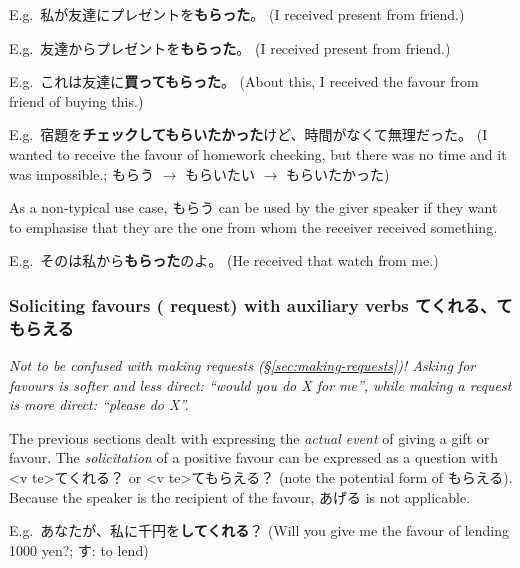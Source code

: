 \documentclass[../nihongo-gakushuu-kyouzai.tex]{subfiles}
\begin{document}


E.g.\ 私が友達にプレゼントを\textbf{もらった}。 (I received present from friend.)

E.g.\ 友達からプレゼントを\textbf{もらった}。 (I received present from friend.)

E.g.\ これは友達に\textbf{買ってもらった}。 (About this, I received the favour from friend of buying this.)

E.g.\ 宿題を\textbf{チェックしてもらいたかった}けど、時間がなくて無理だった。 (I wanted to receive the favour of homework checking, but there was no time and it was impossible.; もらう $\to$ もらいたい $\to$ もらいたかった)

As a non-typical use case, もらう can be used by the giver speaker if they want to emphasise that they are the one from whom the receiver received something.

E.g.\ そのは私から\textbf{もらった}のよ。 (He received that watch from me.)


\subsubsection{Soliciting favours (\neq{} request) with auxiliary verbs てくれる、てもらえる} \label{sec:soliciting-favours-kureru-moraeru}
\emph{Not to be confused with making requests (\S\ref{sec:making-requests})! Asking for favours is softer and less direct: ``would you do X for me'', while making a request is more direct: ``please do X''.}

The previous sections dealt with expressing the \emph{actual event} of giving a gift or favour. The \emph{solicitation} of a positive favour can be expressed as a question with <v te>てくれる？ or <v te>てもらえる？ (note the potential form of もらえる). Because the speaker is the recipient of the favour, あげる is not applicable.


E.g.\ あなたが、私に千円を\textbf{してくれる}？ (Will you give me the favour of lending 1000 yen?; す: to lend)
\end{document}
